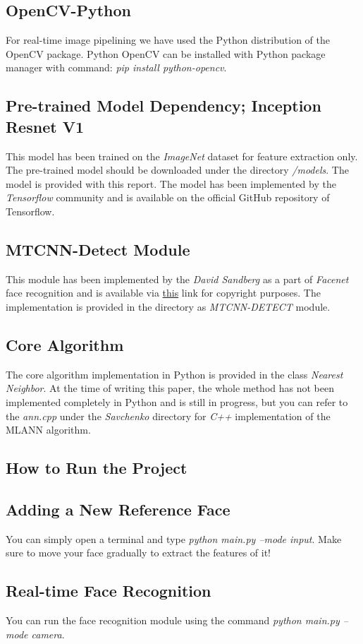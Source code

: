 \subsection{OpenCV-Python}
For real-time image pipelining we have used the Python distribution of the OpenCV package. Python OpenCV can be installed with Python package manager with command: \textit{pip install python-opencv}.

\subsection{Pre-trained Model Dependency; Inception Resnet V1}
This model has been trained on the \textit{ImageNet} dataset for feature extraction only. The pre-trained model should be downloaded under the directory \textit{/models}. The model is provided with this report. The model has been implemented by the \textit{Tensorflow} community and is available on the official GitHub repository of Tensorflow.

\subsection{MTCNN-Detect Module}
This module has been implemented by the \textit{David Sandberg} as a part of \textit{Facenet} face recognition and is available via \href{https://github.com/davidsandberg/facenet}{this} link for copyright purposes. The implementation is provided in the directory as \textit{MTCNN-DETECT} module.

\subsection{Core Algorithm}
The core algorithm implementation in Python is provided in the class \textit{Nearest Neighbor}. At the time of writing this paper, the whole method has not been implemented completely in Python and is still in progress, but you can refer to the \textit{ann.cpp} under the \textit{Savchenko} directory for \textit{C++} implementation of the MLANN algorithm.

\subsection{How to Run the Project}
\subsection{Adding a New Reference Face}
You can simply open a terminal and type \textit{python main.py --mode input}. Make sure to move your face gradually to extract the features of it!

\subsection{Real-time Face Recognition}
You can run the face recognition module using the command \textit{python main.py --mode camera}.